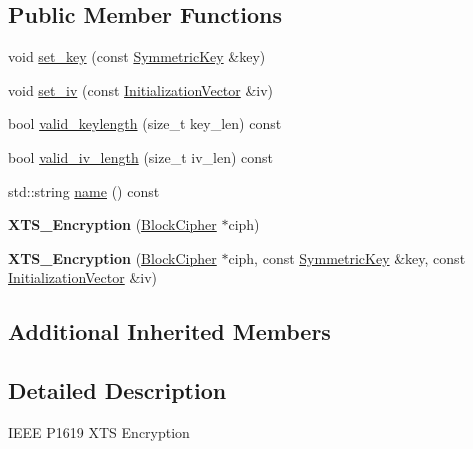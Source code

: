 \subsection*{Public Member Functions}
\begin{DoxyCompactItemize}
\item 
void \hyperlink{classBotan_1_1XTS__Encryption_aa2110dd6f6ec5e8269228426f5f83c8b}{set\-\_\-key} (const \hyperlink{namespaceBotan_a00c78597211d5c63b63e2a57ddb96d38}{Symmetric\-Key} \&key)
\item 
void \hyperlink{classBotan_1_1XTS__Encryption_a5907f7830af1023e15f35f5d5b49da5e}{set\-\_\-iv} (const \hyperlink{namespaceBotan_ab6a07e859c4e3a2ccfd68308ec89497e}{Initialization\-Vector} \&iv)
\item 
bool \hyperlink{classBotan_1_1XTS__Encryption_aa0b627b0ee906134de88278968b49482}{valid\-\_\-keylength} (size\-\_\-t key\-\_\-len) const 
\item 
bool \hyperlink{classBotan_1_1XTS__Encryption_a40d07aeafd04b5b80a730febf592b0e1}{valid\-\_\-iv\-\_\-length} (size\-\_\-t iv\-\_\-len) const 
\item 
std\-::string \hyperlink{classBotan_1_1XTS__Encryption_ae5e61f06d5e048b29465bca786235872}{name} () const 
\item 
\hypertarget{classBotan_1_1XTS__Encryption_a6c25d9bec410b984247d8185b21494fc}{{\bfseries X\-T\-S\-\_\-\-Encryption} (\hyperlink{classBotan_1_1BlockCipher}{Block\-Cipher} $\ast$ciph)}\label{classBotan_1_1XTS__Encryption_a6c25d9bec410b984247d8185b21494fc}

\item 
\hypertarget{classBotan_1_1XTS__Encryption_a0c488d36d29cc7d9845a194ece0a28fa}{{\bfseries X\-T\-S\-\_\-\-Encryption} (\hyperlink{classBotan_1_1BlockCipher}{Block\-Cipher} $\ast$ciph, const \hyperlink{namespaceBotan_a00c78597211d5c63b63e2a57ddb96d38}{Symmetric\-Key} \&key, const \hyperlink{namespaceBotan_ab6a07e859c4e3a2ccfd68308ec89497e}{Initialization\-Vector} \&iv)}\label{classBotan_1_1XTS__Encryption_a0c488d36d29cc7d9845a194ece0a28fa}

\end{DoxyCompactItemize}
\subsection*{Additional Inherited Members}


\subsection{Detailed Description}
I\-E\-E\-E P1619 X\-T\-S Encryption 

